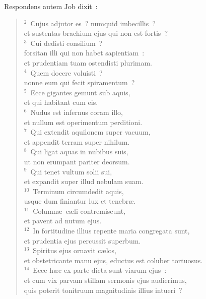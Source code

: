 \lettrine[lines=10,image=true,loversize=0.05,lraise=-0.03]{R}{}espondens autem Job dixit~:
\begin{flushleft}\begin{verse}\vspace{6pt}${}^{2}$~Cujus adjutor es~? numquid imbecillis~?\\ et sustentas brachium ejus qui non est fortis~?\\
${}^{3}$~Cui dedisti consilium~?\\ forsitan illi qui non habet sapientiam~:\\ et prudentiam tuam ostendisti plurimam.\\
${}^{4}$~Quem docere voluisti~?\\ nonne eum qui fecit spiramentum~?\\
${}^{5}$~Ecce gigantes gemunt sub aquis,\\ et qui habitant cum eis.\\
${}^{6}$~Nudus est infernus coram illo,\\ et nullum est operimentum perditioni.\\
${}^{7}$~Qui extendit aquilonem super vacuum,\\ et appendit terram super nihilum.\\
${}^{8}$~Qui ligat aquas in nubibus suis,\\ ut non erumpant pariter deorsum.\\
${}^{9}$~Qui tenet vultum solii sui,\\ et expandit super illud nebulam suam.\\
${}^{10}$~Terminum circumdedit aquis,\\ usque dum finiantur lux et tenebr\ae .\\
${}^{11}$~Column\ae\ c\ae li contremiscunt,\\ et pavent ad nutum ejus.\\
${}^{12}$~In fortitudine illius repente maria congregata sunt,\\ et prudentia ejus percussit superbum.\\
${}^{13}$~Spiritus ejus ornavit c\ae los,\\ et obstetricante manu ejus, eductus est coluber tortuosus.\\
${}^{14}$~Ecce h\ae c ex parte dicta sunt viarum ejus~:\\ et cum vix parvam stillam sermonis ejus audierimus,\\ quis poterit tonitruum magnitudinis illius intueri~?\end{verse}\end{flushleft}



